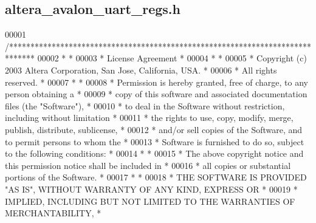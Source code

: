 \subsection{altera\+\_\+avalon\+\_\+uart\+\_\+regs.\+h}
\label{altera__avalon__uart__regs_8h_source}

\begin{DoxyCode}
00001 \textcolor{comment}{/******************************************************************************}
00002 \textcolor{comment}{*                                                                             *}
00003 \textcolor{comment}{* License Agreement                                                           *}
00004 \textcolor{comment}{*                                                                             *}
00005 \textcolor{comment}{* Copyright (c) 2003 Altera Corporation, San Jose, California, USA.           *}
00006 \textcolor{comment}{* All rights reserved.                                                        *}
00007 \textcolor{comment}{*                                                                             *}
00008 \textcolor{comment}{* Permission is hereby granted, free of charge, to any person obtaining a     *}
00009 \textcolor{comment}{* copy of this software and associated documentation files (the "Software"),  *}
00010 \textcolor{comment}{* to deal in the Software without restriction, including without limitation   *}
00011 \textcolor{comment}{* the rights to use, copy, modify, merge, publish, distribute, sublicense,    *}
00012 \textcolor{comment}{* and/or sell copies of the Software, and to permit persons to whom the       *}
00013 \textcolor{comment}{* Software is furnished to do so, subject to the following conditions:        *}
00014 \textcolor{comment}{*                                                                             *}
00015 \textcolor{comment}{* The above copyright notice and this permission notice shall be included in  *}
00016 \textcolor{comment}{* all copies or substantial portions of the Software.                         *}
00017 \textcolor{comment}{*                                                                             *}
00018 \textcolor{comment}{* THE SOFTWARE IS PROVIDED "AS IS", WITHOUT WARRANTY OF ANY KIND, EXPRESS OR  *}
00019 \textcolor{comment}{* IMPLIED, INCLUDING BUT NOT LIMITED TO THE WARRANTIES OF MERCHANTABILITY,    *}

\end{DoxyCode}
